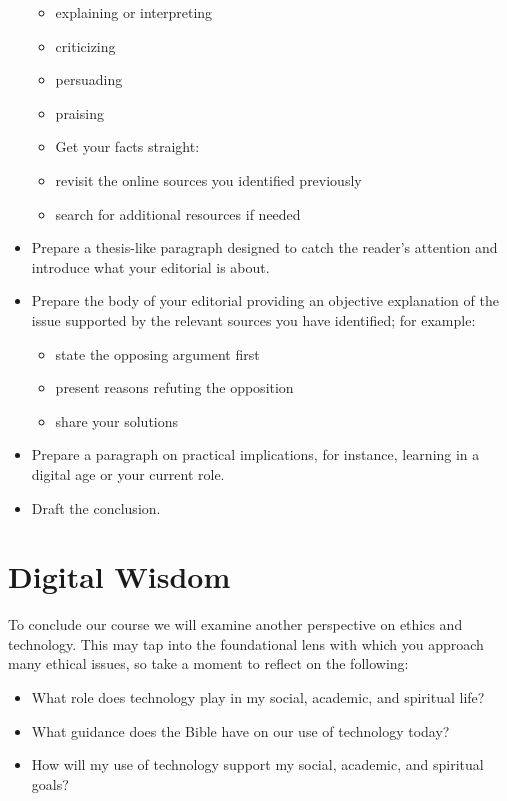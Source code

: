 \documentclass[
  letterpaper,
  DIV=11,
  numbers=noendperiod]{scrreprt}
\providecommand{\tightlist}{%
  \setlength{\itemsep}{0pt}\setlength{\parskip}{0pt}}\usepackage{longtable,booktabs,array}
\begin{document}
\begin{tcolorbox}
\begin{itemize}
  \begin{itemize}
  \tightlist
  \item
    explaining or interpreting
  \item
    criticizing
  \item
    persuading
  \item
    praising
  \item
    Get your facts straight:
  \item
    revisit the online sources you identified previously
  \item
    search for additional resources if needed
  \end{itemize}
\item
  Prepare a thesis-like paragraph designed to catch the reader's
  attention and introduce what your editorial is about.
\item
  Prepare the body of your editorial providing an objective explanation
  of the issue supported by the relevant sources you have identified;
  for example:

  \begin{itemize}
  \tightlist
  \item
    state the opposing argument first
  \item
    present reasons refuting the opposition
  \item
    share your solutions
  \end{itemize}
\item
  Prepare a paragraph on practical implications, for instance, learning
  in a digital age or your current role.
\item
  Draft the conclusion.
\end{itemize}

\end{tcolorbox}

\section{Digital Wisdom}\label{digital-wisdom}

To conclude our course we will examine another perspective on ethics and
technology. This may tap into the foundational lens with which you
approach many ethical issues, so take a moment to reflect on the
following:

\begin{itemize}
\tightlist
\item
  What role does technology play in my social, academic, and spiritual
  life?
\item
  What guidance does the Bible have on our use of technology today?
\item
  How will my use of technology support my social, academic, and
  spiritual goals?
\end{itemize}
\end{document}
